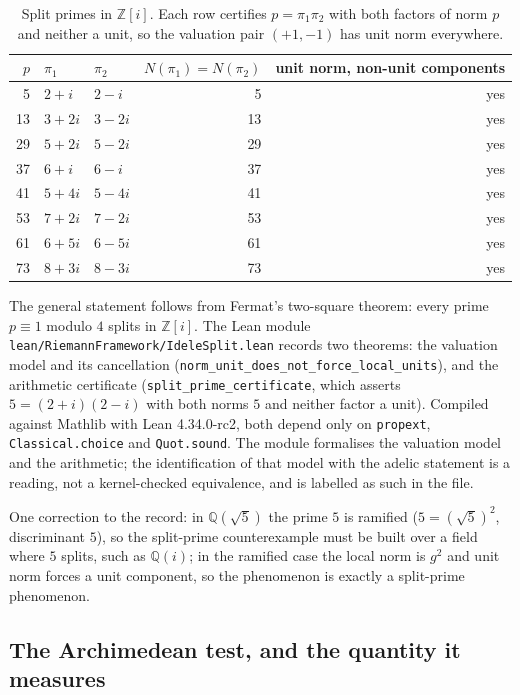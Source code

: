 \documentclass[11pt,a4paper]{article}
\begin{document}
\begin{table}[htbp]
\centering
\caption{Split primes in $\mathbb{Z}[i]$. Each row certifies $p=\pi_1\pi_2$ with both factors
of norm $p$ and neither a unit, so the valuation pair $(+1,-1)$ has unit norm everywhere.}
\label{tab:split}
\footnotesize
\begin{tabular}{@{}rllrr@{}}
\toprule
$p$ & $\pi_1$ & $\pi_2$ & $N(\pi_1)=N(\pi_2)$ & unit norm, non-unit components \\
\midrule
5 & $2+i$ & $2-i$ & 5 & yes \\
13 & $3+2i$ & $3-2i$ & 13 & yes \\
29 & $5+2i$ & $5-2i$ & 29 & yes \\
37 & $6+i$ & $6-i$ & 37 & yes \\
41 & $5+4i$ & $5-4i$ & 41 & yes \\
53 & $7+2i$ & $7-2i$ & 53 & yes \\
61 & $6+5i$ & $6-5i$ & 61 & yes \\
73 & $8+3i$ & $8-3i$ & 73 & yes \\
\bottomrule
\end{tabular}
\end{table}

The general statement follows from Fermat's two-square theorem: every prime $p\equiv1$
modulo $4$ splits in $\mathbb{Z}[i]$. The Lean module \texttt{lean/RiemannFramework/IdeleSplit.lean}
records two theorems: the valuation model and its cancellation
(\texttt{norm\_unit\_does\_not\_force\_local\_units}), and the arithmetic certificate
(\texttt{split\_prime\_certificate}, which asserts $5=(2+i)(2-i)$ with both norms $5$ and
neither factor a unit). Compiled against Mathlib with Lean 4.34.0-rc2, both depend only on
\texttt{propext}, \texttt{Classical.choice} and \texttt{Quot.sound}. The module formalises the
valuation model and the arithmetic; the identification of that model with the adelic statement
is a reading, not a kernel-checked equivalence, and is labelled as such in the file.

One correction to the record: in $\mathbb{Q}(\sqrt{5})$ the prime $5$ is ramified
($5=(\sqrt{5})^2$, discriminant $5$), so the split-prime counterexample must be built over a
field where $5$ splits, such as $\mathbb{Q}(i)$; in the ramified case the local norm is $g^2$
and unit norm forces a unit component, so the phenomenon is exactly a split-prime phenomenon.

\subsection{The Archimedean test, and the quantity it measures}
\end{document}
